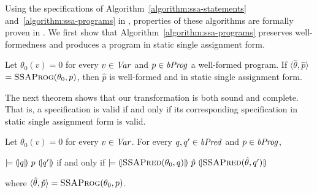 Using the specifications of Algorithm~\ref{algorithm:ssa-statements}
and~\ref{algorithm:ssa-programs} in \gallina, properties of these
algorithms are formally proven in \coq. We first show that
Algorithm~\ref{algorithm:ssa-programs} preserves well-formedness and
produces a program in static single assignment form.
\begin{lemma}
  Let $\theta_0(v) = 0$ for every $v \in \mathit{Var}$ and $p \in \mathit{bProg}$ a
  well-formed program. If
  $\langle \hat{\theta}, \hat{p} \rangle$ $=
  \textsc{SSAProg}(\theta_0, p)$, then
  $\hat{p}$ is well-formed and in static single assignment form.
  \label{lemma:ssa-programs}
\end{lemma}

The next theorem shows that our transformation is both sound and
complete. That is, a specification is valid if and only if its
corresponding specification in static single assignment form is valid.
\begin{theorem}
  Let $\theta_0(v) = 0$ for every $v \in \mathit{Var}$. For every $q, q' \in \mathit{bPred}$
  and $p \in \mathit{bProg}$,
  \begin{center}
    $\models {(\!|}{q}{|\!)}~{p}~{(\!|}{q'}{|\!)}$ if and only if
    $\models {(\!|}{\textsc{SSAPred}(\theta_0, q)}{|\!)}~{\hat{p}}~{(\!|}{\textsc{SSAPred}(\hat{\theta}, q')}{|\!)}$
  \end{center}
  where $\langle \hat{\theta}, \hat{p} \rangle =
  \textsc{SSAProg}(\theta_0, p)$.
  \label{theorem:ssa}
\end{theorem}


